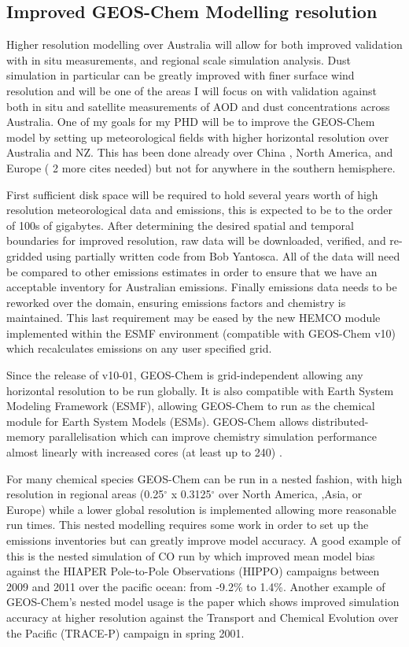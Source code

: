 \subsection{Improved GEOS-Chem Modelling resolution}

Higher resolution modelling over Australia will allow for both improved validation with in situ measurements, and regional scale simulation analysis. 
Dust simulation in particular can be greatly improved with finer surface wind resolution and will be one of the areas I will focus on with validation against both in situ and satellite measurements of AOD and dust concentrations across Australia.
One of my goals for my PHD will be to improve the GEOS-Chem model by setting up meteorological fields with higher horizontal resolution over Australia and NZ.
This has been done already over China \cite{Chen_2009}, North America, and Europe ( 2 more cites needed) but not for anywhere in the southern hemisphere.

First sufficient disk space will be required to hold several years worth of high resolution meteorological data and emissions, this is expected to be to the order of 100s of gigabytes.
After determining the desired spatial and temporal boundaries for improved resolution, raw data will be downloaded, verified, and re-gridded using partially written code from Bob Yantosca.
All of the data will need be compared to other emissions estimates in order to ensure that we have an acceptable inventory for Australian emissions.
Finally emissions data needs to be reworked over the domain, ensuring emissions factors and chemistry is maintained.
This last requirement may be eased by the new HEMCO module implemented within the ESMF environment (compatible with GEOS-Chem v10) which recalculates emissions on any user specified grid.
  
Since the release of v10-01, GEOS-Chem is grid-independent allowing any horizontal resolution to be run globally. 
It is also compatible with Earth System Modeling Framework (ESMF), allowing GEOS-Chem to run as the chemical module for Earth System Models (ESMs). 
GEOS-Chem allows distributed-memory parallelisation which can improve chemistry simulation performance almost linearly with increased cores (at least up to 240) \cite{Long_2015}.

For many chemical species GEOS-Chem can be run in a nested fashion, with high resolution in regional areas (0.25$^{\circ}$ x 0.3125$^{\circ}$ over North America, ,Asia, or Europe) while a lower global resolution is implemented allowing more reasonable run times.
This nested modelling requires some work in order to set up the emissions inventories but can greatly improve model accuracy.
A good example of this is the nested simulation of CO run by \citet{Yan_2014} which improved mean model bias against the HIAPER Pole-to-Pole Observations (HIPPO) campaigns between 2009 and 2011 over the pacific ocean: from -9.2\% to 1.4\%.
Another example of GEOS-Chem's nested model usage is the \citet{http://onlinelibrary.wiley.com/doi/10.1029/2004JD005237/pdf} paper which shows improved simulation accuracy at higher resolution against the Transport and Chemical Evolution over the Pacific (TRACE-P) campaign in spring 2001. 

